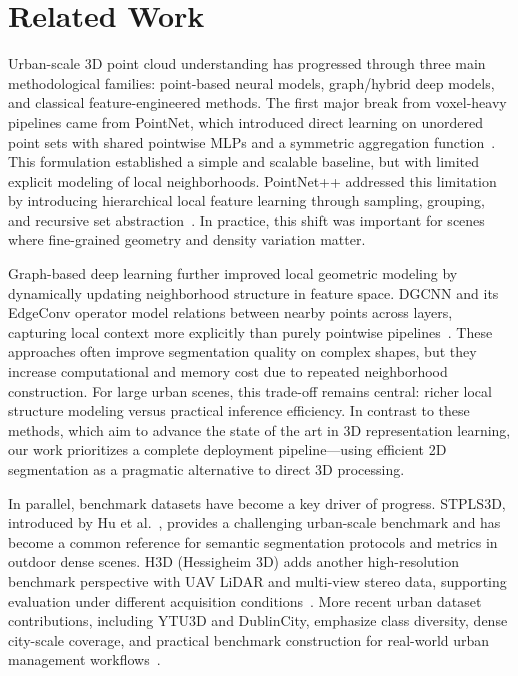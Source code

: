 \documentclass[11pt]{article}
\begin{document}
\section{Related Work}
\label{sec:related_work}

Urban-scale 3D point cloud understanding has progressed through three main methodological families: point-based neural models, graph/hybrid deep models, and classical feature-engineered methods.
The first major break from voxel-heavy pipelines came from PointNet, which introduced direct learning on unordered point sets with shared pointwise MLPs and a symmetric aggregation function~\cite{qi2017pointnet}.
This formulation established a simple and scalable baseline, but with limited explicit modeling of local neighborhoods.
PointNet++ addressed this limitation by introducing hierarchical local feature learning through sampling, grouping, and recursive set abstraction~\cite{qi2017pointnetpp}.
In practice, this shift was important for scenes where fine-grained geometry and density variation matter.

Graph-based deep learning further improved local geometric modeling by dynamically updating neighborhood structure in feature space.
DGCNN and its EdgeConv operator model relations between nearby points across layers, capturing local context more explicitly than purely pointwise pipelines~\cite{wang2019dgcnn}.
These approaches often improve segmentation quality on complex shapes, but they increase computational and memory cost due to repeated neighborhood construction.
For large urban scenes, this trade-off remains central: richer local structure modeling versus practical inference efficiency.
In contrast to these methods, which aim to advance the state of the art in 3D representation learning, our work prioritizes a complete deployment pipeline---using efficient 2D segmentation as a pragmatic alternative to direct 3D processing.

In parallel, benchmark datasets have become a key driver of progress.
STPLS3D, introduced by Hu et al.~\cite{hu2021stpls3d}, provides a challenging urban-scale benchmark and has become a common reference for semantic segmentation protocols and metrics in outdoor dense scenes.
H3D (Hessigheim 3D) adds another high-resolution benchmark perspective with UAV LiDAR and multi-view stereo data, supporting evaluation under different acquisition conditions~\cite{kolle2021h3d}.
More recent urban dataset contributions, including YTU3D and DublinCity, emphasize class diversity, dense city-scale coverage, and practical benchmark construction for real-world urban management workflows~\cite{bayrak2024ytu3d,zolanvari2019dublincity}.
\end{document}
